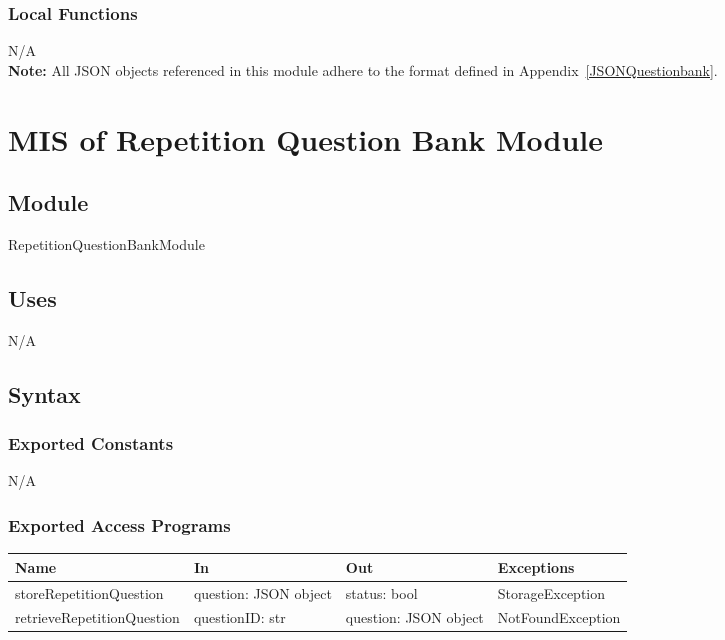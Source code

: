 \documentclass[12pt, titlepage]{article}
\begin{document}
\subsubsection{Local Functions}

N/A\\
\noindent \textbf{Note:} All JSON objects referenced in this module adhere to the format defined in Appendix~\ref{JSONQuestionbank}.
\section{MIS of Repetition Question Bank Module} \label{RepetitionQuestionBankModule}

\subsection{Module}

RepetitionQuestionBankModule

\subsection{Uses}

N/A

\subsection{Syntax}

\subsubsection{Exported Constants}

N/A

\subsubsection{Exported Access Programs}

\begin{center}
\begin{tabular}{p{5cm} p{3cm} p{3cm} p{5cm}}
\hline
\textbf{Name} & \textbf{In} & \textbf{Out} & \textbf{Exceptions} \\
\hline
storeRepetitionQuestion & \raggedright\arraybackslash question: JSON object & \raggedright\arraybackslash status: bool & \raggedright\arraybackslash StorageException \\
\hline
retrieveRepetitionQuestion & \raggedright\arraybackslash questionID: str & \raggedright\arraybackslash question: JSON object & \raggedright\arraybackslash NotFoundException \\
\hline
\end{tabular}
\end{center}
\end{document}

